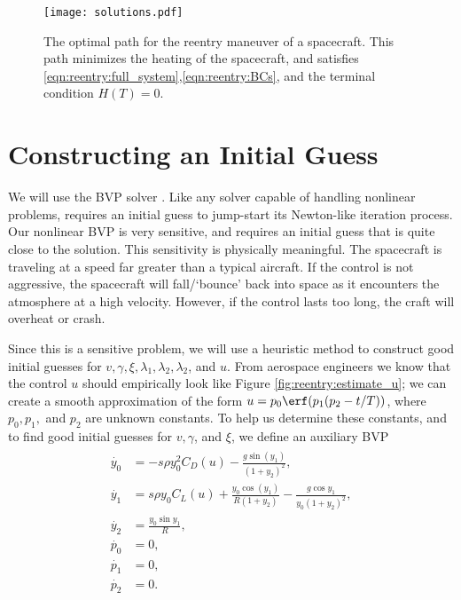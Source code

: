 \begin{figure}
\centering
\texttt{[image: solutions.pdf]}
\caption{The optimal path for the reentry maneuver of a spacecraft. 
This path minimizes the heating of the spacecraft, and satisfies  \eqref{eqn:reentry:full_system},\eqref{eqn:reentry:BCs}, and the terminal condition $H(T) = 0$.
}
\label{fig:reentry:solutions}
\end{figure}


\section*{Constructing an Initial Guess}
We will use the BVP solver .
Like any solver capable of handling nonlinear problems,  requires an initial guess to jump-start its Newton-like iteration process.
Our nonlinear BVP is very sensitive, and requires an initial guess that is quite close to the solution.  
This sensitivity is physically meaningful. 
The spacecraft is traveling at a speed far greater than a typical aircraft. 
If the control is not aggressive, the spacecraft will fall/`bounce' back into space as it encounters the atmosphere at a high velocity. 
However, if the control lasts too long, the craft will overheat or crash.

Since this is a sensitive problem, we will use a heuristic method to construct good initial guesses for $v, \gamma, \xi, \lambda_1, \lambda_2,\lambda_2$, and $u$.
From aerospace engineers we know that the control $u$ should empirically look like Figure \ref{fig:reentry:estimate_u}; 
we can create a smooth approximation of the form $u = p_0\erf(p_1(p_2-t/T))$, where $p_0, p_1,$ and $p_2$ are unknown constants. 
To help us determine these constants, and to find good initial guesses for $v, \gamma$, and $\xi$, we define an auxiliary BVP
\begin{align}
\begin{split}
\dot{y_0} &= -s\rho y_0^2C_D(u) - \frac{g\sin(y_1)}{(1+y_2)^2},\\
\dot{y_1} &= s \rho y_0 C_L(u) + \frac{y_0 \cos(y_1)}{R(1+y_2)} - \frac{g \cos y_1}{y_0(1+y_2)^2},\\
\dot{y_2} &= \frac{y_0 \sin y_1}{R} ,\\
\dot{p_0} &= 0, \\
\dot{p_1} &= 0, \\
\dot{p_2} &= 0.
\end{split} \label{eqn:reentry:control_system_auxiliary}
\end{align}

